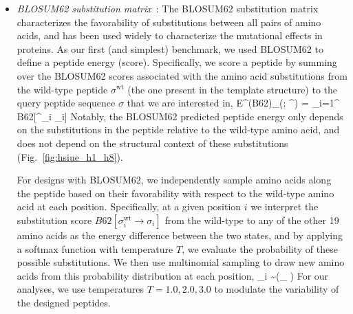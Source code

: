 \begin{itemize}
\item {\em BLOSUM62 substitution matrix}~\cite{Henikoff1992-jq}: The BLOSUM62 substitution matrix
characterizes the favorability of substitutions between all pairs of amino acids, and has been used
widely to characterize the mutational effects in proteins. As our first (and simplest) benchmark, we
used BLOSUM62 to define a peptide energy (score). Specifically, we score a peptide by summing over
the BLOSUM62 scores associated with the amino acid substitutions from the wild-type peptide $
\sigma^{\text{wt}}$ (the one present in the template structure) to the query peptide sequence
$\sigma$ that we are interested in,
\EQ
E^{\rm (B62)}_{}(\sigma; \sigma^{}) = \sum_{i=1}^\ell
B62[\sigma^{}_i \to \sigma_i]
\label{eq:score_blosum}
\EE
Notably, the BLOSUM62 predicted peptide energy only depends on the substitutions in the peptide
relative to the wild-type amino acid, and does not depend on the structural context of these
substitutions (Fig.~\ref{fig:hsiue_h1_h8}).

For designs with BLOSUM62, we independently sample amino acids along the peptide based on their
favorability with respect to the wild-type amino acid at each position. Specifically, at a given
position $i$ we interpret the substitution score $B62[\sigma^{\text{wt}}_i \to \sigma_i]$ from the
wild-type to any of the other 19 amino acids as the energy difference between the two states, and by
applying a softmax function with temperature $T$, we evaluate the probability of these possible
substitutions. We then use multinomial sampling to draw new amino acids from this probability
distribution at each position,
\EQ
\sigma_i \sim {}\left(_{{\sigma} \in {}}\right)
\EE
For our analyses, we use temperatures $T=1.0, 2.0, 3.0$ to modulate the variability of the designed
peptides.\\



\end{itemize}
